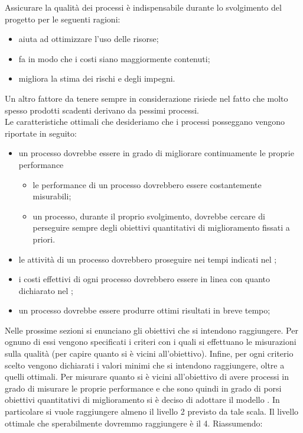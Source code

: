 		  \label{subsec:obiettiviprocesso}
			Assicurare la qualità dei processi è indispensabile durante lo svolgimento del progetto per le seguenti ragioni:
			\begin{itemize}
				\item aiuta ad ottimizzare l'uso delle risorse;
				\item fa in modo che i costi siano maggiormente contenuti;
				\item migliora la stima dei rischi e degli impegni.
			\end{itemize}
			Un altro fattore da tenere sempre in considerazione risiede nel fatto che molto spesso prodotti scadenti derivano da pessimi processi.\\
			Le caratteristiche ottimali che desideriamo che i processi posseggano vengono riportate in seguito:
			\begin{itemize}
				\item un processo dovrebbe essere in grado di migliorare continuamente le proprie performance
				\begin{itemize}
					\item le performance di un processo dovrebbero essere costantemente misurabili;
					\item un processo, durante il proprio svolgimento, dovrebbe cercare di perseguire sempre degli obiettivi quantitativi di miglioramento fissati a priori.
				\end{itemize}
				\item le attività di un processo dovrebbero proseguire nei tempi indicati nel ;
				\item i costi effettivi di ogni processo dovrebbero essere in linea con quanto dichiarato nel ;
				\item un processo dovrebbe essere produrre ottimi risultati in breve tempo;
			\end{itemize}
			Nelle prossime sezioni si enunciano gli obiettivi che si intendono raggiungere. Per ognuno di essi vengono specificati i criteri con i quali si effettuano le misurazioni sulla qualità (per capire quanto si è vicini all'obiettivo). Infine, per ogni criterio scelto vengono dichiarati i valori minimi che si intendono raggiungere, oltre a quelli ottimali.
				Per misurare quanto si è vicini all'obiettivo di avere processi in grado di misurare le proprie performance e che sono quindi in grado di porsi obiettivi quantitativi di miglioramento si è deciso di adottare il modello . In particolare si vuole raggiungere almeno il livello 2 previsto da tale scala. Il livello ottimale che sperabilmente dovremmo raggiungere è il 4. Riassumendo:
